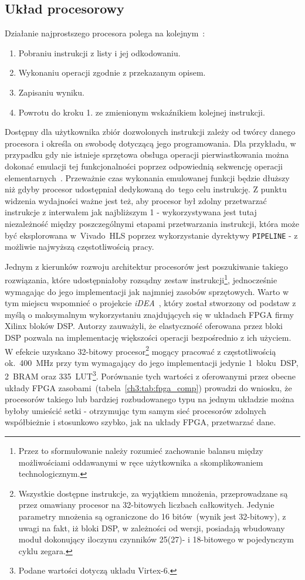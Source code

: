 \subsection{Układ procesorowy}
Działanie najprostszego procesora polega na kolejnym~\cite{RISCV}:
\begin{enumerate}
\item Pobraniu instrukcji z listy i jej odkodowaniu.
\item Wykonaniu operacji zgodnie z przekazanym opisem.
\item Zapisaniu wyniku.
\item Powrotu do kroku 1. ze zmienionym wskaźnikiem kolejnej instrukcji.
\end{enumerate}
Dostępny dla użytkownika zbiór dozwolonych instrukcji zależy od twórcy danego procesora i określa on swobodę dotyczącą jego programowania. Dla przykładu, w przypadku gdy nie istnieje sprzętowa obsługa operacji pierwiastkowania można dokonać emulacji tej funkcjonalności poprzez odpowiednią sekwencję operacji elementarnych~\cite{FAST_INV_SQRT}. Przeważnie czas wykonania emulowanej funkcji będzie dłuższy niż gdyby procesor udostępniał dedykowaną do~tego celu instrukcję. Z punktu widzenia wydajności ważne jest też, aby procesor był zdolny przetwarzać instrukcje z interwałem jak najbliższym 1 - wykorzystywana jest tutaj niezależność między poszczególnymi etapami przetwarzania instrukcji, która może być eksplorowana w~Vivado~HLS poprzez wykorzystanie dyrektywy \texttt{PIPELINE} - z  możliwie najwyższą częstotliwością pracy. 

Jednym z kierunków rozwoju architektur procesorów jest poszukiwanie takiego rozwiązania, które udostępniałoby rozsądny zestaw instrukcji\footnote{Przez to sformułowanie należy rozumieć zachowanie balansu między możliwościami oddawanymi w ręce użytkownika a skomplikowaniem technologicznym.}, jednocześnie wymagając do jego implementacji jak najmniej zasobów sprzętowych. Warto w tym miejscu wspomnieć o projekcie \textit{iDEA}~\cite{iDEA}, który został stworzony od podstaw z myślą o maksymalnym wykorzystaniu znajdujących się w układach FPGA firmy Xilinx bloków DSP. Autorzy zauważyli, że elastyczność oferowana przez bloki DSP pozwala na implementację większości operacji bezpośrednio z ich użyciem. W efekcie uzyskano 32-bitowy procesor\footnote{Wszystkie dostępne instrukcje, za wyjątkiem mnożenia, przeprowadzane są przez omawiany procesor na 32-bitowych liczbach całkowitych. Jedynie parametry mnożenia są ograniczone do 16 bitów~(wynik jest 32-bitowy), z uwagi na fakt, iż bloki DSP, w zależności od wersji, posiadają wbudowany moduł dokonujący iloczynu czynników 25(27)- i 18-bitowego w pojedynczym cyklu zegara.} mogący pracować z częstotliwością ok.~400~MHz przy tym wymagający do jego implementacji jedynie 1~bloku~DSP, 2~BRAM oraz 335~LUT\footnote{Podane wartości dotyczą układu Virtex-6.}. Porównanie tych wartości z oferowanymi przez obecne układy FPGA zasobami~(tabela~\ref{ch3:tab:fpga_comp})  prowadzi do wniosku, że procesorów takiego lub bardziej rozbudowanego typu na jednym układzie można byłoby umieścić setki - otrzymując tym samym sieć procesorów zdolnych współbieżnie i stosunkowo szybko, jak na układy FPGA, przetwarzać dane. 


